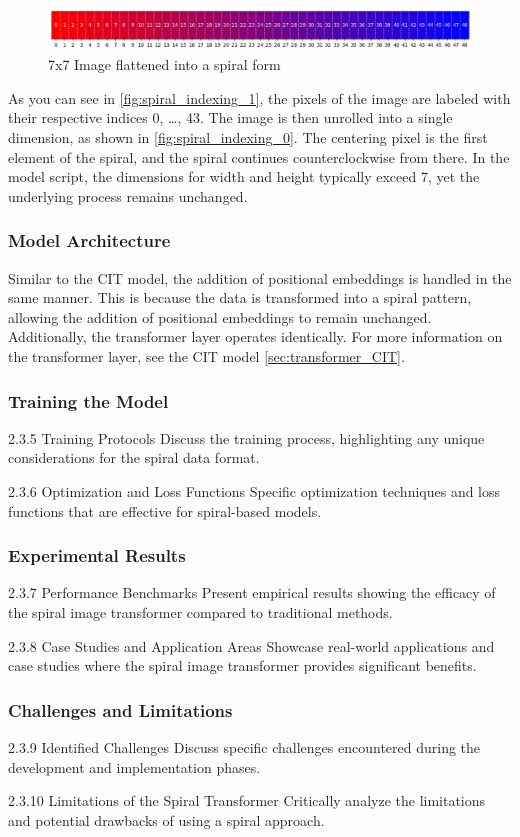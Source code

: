    \begin{figure}[H]
    \centering
    \includegraphics[width=1\textwidth]{../code/dataAnalysis/plots/exampleImgs/spiralShowcase0.png}
    \caption{7x7 Image flattened into a spiral form} 
    \label{fig:spiral_indexing_0}        
    \end{figure}

    As you can see in \autoref{fig:spiral_indexing_1}, the pixels of the image are labeled with their respective indices 0, \dots, 43. The image is then unrolled into a single dimension, as shown in \autoref{fig:spiral_indexing_0}. The centering pixel is the first element of the spiral, and the spiral continues counterclockwise from there. In the model script, the dimensions for width and height typically exceed 7, yet the underlying process remains unchanged.



\subsubsection{Model Architecture}

Similar to the CIT model, the addition of positional embeddings is handled in the same manner. This is because the data is transformed into a spiral pattern, allowing the addition of positional embeddings to remain unchanged. Additionally, the transformer layer operates identically. For more information on the transformer layer, see the CIT model \autoref{sec:transformer_CIT}.


\subsubsection{Training the Model}
2.3.5 Training Protocols
Discuss the training process, highlighting any unique considerations for the spiral data format.

2.3.6 Optimization and Loss Functions
Specific optimization techniques and loss functions that are effective for spiral-based models.

\subsubsection{Experimental Results}
2.3.7 Performance Benchmarks
Present empirical results showing the efficacy of the spiral image transformer compared to traditional methods.

2.3.8 Case Studies and Application Areas
Showcase real-world applications and case studies where the spiral image transformer provides significant benefits.


\subsubsection{Challenges and Limitations}
2.3.9 Identified Challenges
Discuss specific challenges encountered during the development and implementation phases.

2.3.10 Limitations of the Spiral Transformer
Critically analyze the limitations and potential drawbacks of using a spiral approach.